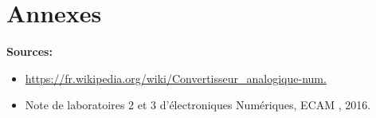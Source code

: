 \section*{Annexes}
\textbf{Sources:}
\begin{itemize}
\item \url{https://fr.wikipedia.org/wiki/Convertisseur_analogique-num.}
\item Note de laboratoires 2 et 3 d'électroniques Numériques, ECAM , 2016.
\end{itemize}